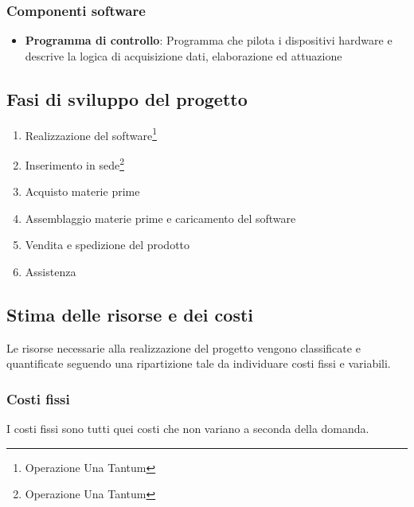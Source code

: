 \subsubsection{Componenti software}
\begin{itemize}
\item \textbf{Programma di controllo}: Programma che pilota i dispositivi
hardware e descrive la logica di acquisizione dati, elaborazione ed attuazione
\end{itemize}
\subsection{Fasi di sviluppo del progetto}
\begin{enumerate}
\item Realizzazione del software\footnote{Operazione Una Tantum}
\item Inserimento in sede\footnote{Operazione Una Tantum}
\item Acquisto materie prime
\item Assemblaggio materie prime e caricamento del software
\item Vendita e spedizione del prodotto
\item Assistenza
\end{enumerate}
\subsection{Stima delle risorse e dei costi}
Le risorse necessarie alla realizzazione del progetto vengono classificate e
quantificate seguendo una ripartizione tale da individuare costi fissi e
variabili.  
%
\subsubsection{Costi fissi}
I costi fissi sono tutti quei costi che non variano a seconda della domanda.

